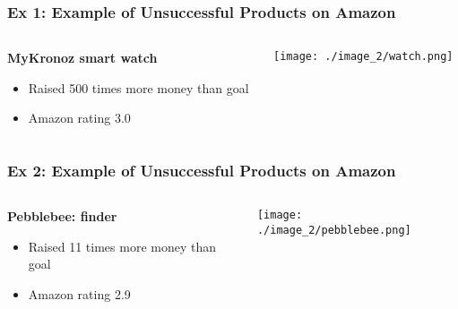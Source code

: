 \documentclass[9pt]{beamer}
\begin{document}
\begin{frame}
\frametitle{Ex 1: Example of Unsuccessful Products on Amazon }
\begin{columns}
	\begin{column}{.40\textwidth}  {\textbf{MyKronoz smart watch}}
		
		\begin{itemize}[label=\textcolor{blue}{\textbullet}]
			\item{\small Raised 500 times more money than goal}
			\item{\small Amazon rating 3.0}
		\end{itemize}
	\end{column}		
	
	\begin{column}{.50\textwidth} 
		\texttt{[image: ./image\_2/watch.png]}
	\end{column}				
\end{columns}
\end{frame}



\begin{frame}
\frametitle{Ex 2: Example of Unsuccessful Products on Amazon }
\begin{columns}
	\begin{column}{.40\textwidth} {\textbf{Pebblebee: finder}}
		
		\begin{itemize}[label=\textcolor{blue}{\textbullet}]
			\item{\small Raised 11 times more money than goal}
			\item{\small Amazon rating 2.9}
		\end{itemize}
	\end{column}		
	
	\begin{column}{.50\textwidth} 
		\texttt{[image: ./image\_2/pebblebee.png]}
	\end{column}				
\end{columns}
\end{frame}
\end{document}
